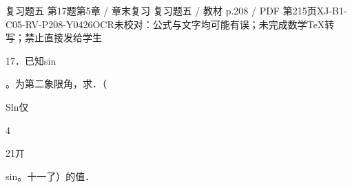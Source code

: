 \begin{bankitem}{复习题五 第17题}{第5章 / 章末复习 复习题五 / 教材 p.208 / PDF 第215页}{XJ-B1-C05-RV-P208-Y0426}{OCR未校对：公式与文字均可能有误；未完成数学TeX转写；禁止直接发给学生}
\begin{ocrdraft}
\par
17．已知sin
\par
。为第二象限角，求．（
\par
Sln仅
\par
4
\par
21丌
\par
sin。十一了）的值．
\end{ocrdraft}
\end{bankitem}
